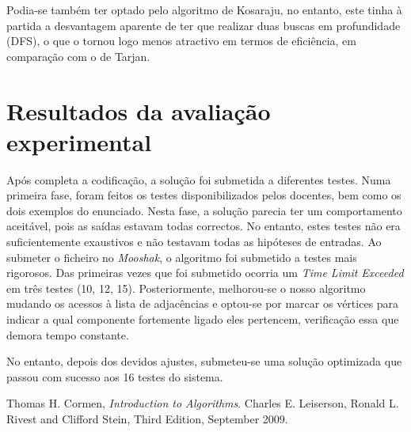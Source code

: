 \documentclass[12pt]{article}
\begin{document}
Podia-se também ter optado pelo algoritmo de Kosaraju, no entanto, este tinha à partida a desvantagem aparente de ter que realizar duas buscas em profundidade (DFS), o que o tornou logo menos atractivo em termos de eficiência, em comparação com o de Tarjan.


\section*{Resultados da avaliação experimental}

%
%
%


Após completa a codificação, a solução foi submetida a diferentes testes. Numa primeira fase, foram feitos os testes disponibilizados pelos docentes, bem como os dois exemplos do enunciado. Nesta fase, a solução parecia ter um comportamento aceitável, pois as saídas estavam todas correctos. No entanto, estes testes não era suficientemente exaustivos e não testavam todas as hipóteses de entradas. Ao submeter o ficheiro no \emph{Mooshak}, o algoritmo foi submetido a testes mais rigorosos. Das primeiras vezes que foi submetido ocorria um \emph{Time Limit Exceeded} em três testes (10, 12, 15). Posteriormente, melhorou-se o nosso algoritmo mudando os acessos à lista de adjacências e optou-se por marcar os vértices para indicar a qual componente fortemente ligado eles pertencem, verificação essa que demora tempo constante.

No entanto, depois dos devidos ajustes, submeteu-se uma solução optimizada que passou com sucesso aos 16 testes do sistema.

\begin{thebibliography}{9}

  Thomas H. Cormen,
  \emph{Introduction to Algorithms}.
  Charles E. Leiserson, Ronald L. Rivest and Clifford Stein,
  Third Edition,
  September 2009.

\end{thebibliography}
\end{document}
